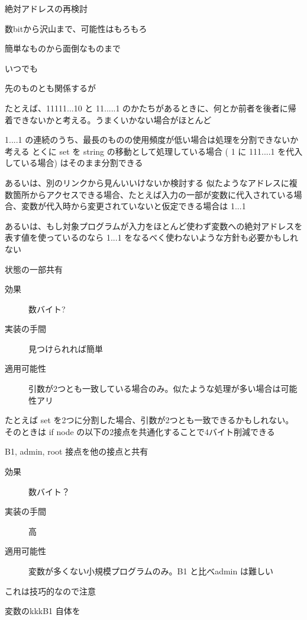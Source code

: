 \documentclass[12pt,unicode]{beamer}
\begin{document}
\begin{frame}
   \begin{description}{絶対アドレスの再検討}
      \item[効果] 数bitから沢山まで、可能性はもろもろ
      \item[実装の手間] 簡単なものから面倒なものまで
      \item[適用可能性] いつでも
   \end{description}
   先のものとも関係するが

   たとえば、11111...10 と 11.....1 のかたちがあるときに、何とか前者を後者に帰着できないかと考える。うまくいかない場合がほとんど

   1....1 の連続のうち、最長のものの使用頻度が低い場合は処理を分割できないか考える
   とくに set を string の移動として処理している場合 ( 1 に 111....1 を代入している場合) はそのまま分割できる

   あるいは、別のリンクから見んいいけないか検討する
   似たようなアドレスに複数箇所からアクセスできる場合、たとえば入力の一部が変数に代入されている場合、変数が代入時から変更されていないと仮定できる場合は 1...1

   あるいは、もし対象プログラムが入力をほとんど使わず変数への絶対アドレスを表す値を使っているのなら 1...1 をなるべく使わないような方針も必要かもしれない

\end{frame}

\begin{frame}{状態の一部共有}
   \begin{description}
      \item[効果] 数バイト?
      \item[実装の手間] 見つけられれば簡単
      \item[適用可能性] 引数が2つとも一致している場合のみ。似たような処理が多い場合は可能性アリ
   \end{description}

   たとえば set を2つに分割した場合、引数が2つとも一致できるかもしれない。
   そのときは if node の以下の2接点を共通化することで4バイト削減できる
\end{frame}

\begin{frame}{B1, admin, root 接点を他の接点と共有}
   \begin{description}
      \item[効果] 数バイト？
      \item[実装の手間] 高
      \item[適用可能性] 変数が多くない小規模プログラムのみ。B1 と比べadmin は難しい
   \end{description}
   これは技巧的なので注意

   変数のkkkB1 自体を
\end{frame}
\end{document}
